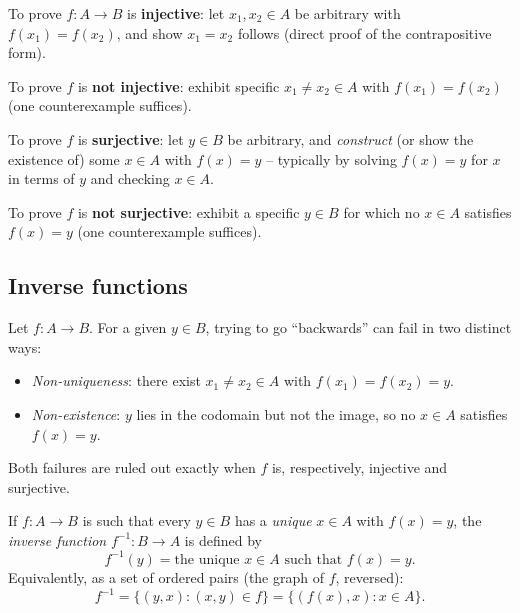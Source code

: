 \begin{note}
To prove $f: A \to B$ is \textbf{injective}: let $x_1, x_2 \in A$ be arbitrary with $f(x_1) = f(x_2)$, and show $x_1 = x_2$ follows (direct proof of the contrapositive form).

To prove $f$ is \textbf{not injective}: exhibit specific $x_1 \neq x_2 \in A$ with $f(x_1) = f(x_2)$ (one counterexample suffices).

To prove $f$ is \textbf{surjective}: let $y \in B$ be arbitrary, and \emph{construct} (or show the existence of) some $x \in A$ with $f(x) = y$ -- typically by solving $f(x) = y$ for $x$ in terms of $y$ and checking $x \in A$.

To prove $f$ is \textbf{not surjective}: exhibit a specific $y \in B$ for which no $x \in A$ satisfies $f(x) = y$ (one counterexample suffices).
\end{note}

\subsection{Inverse functions}
\label{sec:2-8}

\begin{note}
Let $f: A \to B$. For a given $y \in B$, trying to go ``backwards'' can fail in two distinct ways:
\begin{itemize}
    \item \emph{Non-uniqueness}: there exist $x_1 \neq x_2 \in A$ with $f(x_1) = f(x_2) = y$.
    \item \emph{Non-existence}: $y$ lies in the codomain but not the image, so no $x \in A$ satisfies $f(x)=y$.
\end{itemize}
Both failures are ruled out exactly when $f$ is, respectively, injective and surjective.
\end{note}

\begin{definition}
If $f: A \to B$ is such that every $y \in B$ has a \emph{unique} $x \in A$ with $f(x) = y$, the \emph{inverse function} $f^{-1} : B \to A$ is defined by
\[
f^{-1}(y) = \text{the unique } x \in A \text{ such that } f(x) = y.
\]
Equivalently, as a set of ordered pairs (the graph of $f$, reversed):
\[
f^{-1} = \{(y,x) : (x,y) \in f\} = \{(f(x),x) : x \in A\}.
\]
\end{definition}

